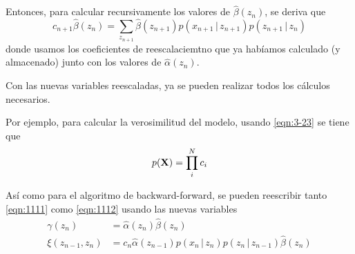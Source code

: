 Entonces, para calcular recursivamente los valores de $\hat \beta(z_n)$, se deriva que 
\begin{equation}
  c_{n+1} \hat \beta(z_n) = \sum_{z_{n+1}} \hat \beta(z_{n+1})
    p(x_{n+1} \,|\, z_{n+1}) p(z_{n+1} \,|\, z_n)    
  \label{eqn:3-28}
\end{equation}
donde usamos los coeficientes de reescalaciemtno que ya habíamos calculado (y almacenado) junto con los valores de $\hat \alpha(z_n)$.

Con las nuevas variables reescaladas, ya se pueden realizar todos los cálculos necesarios. 

Por ejemplo, para calcular la verosimilitud del modelo, usando \eqref{eqn:3-23} se tiene que
\begin{equation}
  p(\textbf{X}) =  \prod_i^N c_i
\end{equation}

Así como para el algoritmo de backward-forward, se pueden reescribir tanto     \eqref{eqn:1111} como \eqref{eqn:1112} usando las nuevas variables 
\begin{align}
  \gamma(z_n) &= \hat \alpha(z_n) \hat \beta(z_n) \\
  \xi(z_{n-1}, z_n) &= c_n \hat \alpha(z_{n-1}) p(x_n \,|\, z_n) 
      p(z_n \,|\, z_{n-1}) \hat \beta(z_n) 
\end{align}
